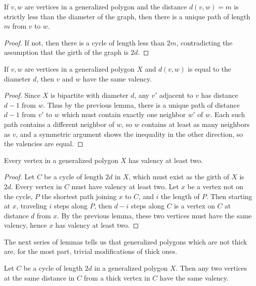 \begin{lemma}
	If $v,w$ are vertices in a generalized polygon and the distance $d(v,w)=m$ is strictly less than the diameter of the graph, then there is a unique path of length $m$ from $v$ to $w$.
\end{lemma}
\begin{proof}
	If not, then there is a cycle of length less than $2m$, contradicting the assumption that the girth of the graph is $2d$.
\end{proof}
\begin{lemma}
	If $v,w$ are vertices in a generalized polygon $X$ and $d(v,w)$ is equal to the diameter $d$, then $v$ and $w$ have the same valency.
\end{lemma}
\begin{proof}
	Since $X$ is bipartite with diameter $d$, any $v'$ adjacent to $v$ has distance $d-1$ from $w$.  Thus by the previous lemma, there is a unique path of distance $d-1$ from $v'$ to $w$ which must contain exactly one neighbor $w'$ of $w$.  Each such path contains a different neighbor of $w$, so $w$ contains at least as many neighbors as $v$, and a symmetric argument shows the inequality in the other direction, so the valencies are equal.
\end{proof}
\begin{lemma}
	Every vertex in a generalized polygon $X$ has valency at least two.
\end{lemma}
\begin{proof}
	Let $C$ be a cycle of length $2d$ in $X$, which must exist as the girth of $X$ is $2d$.  Every vertex in $C$ must have valency at least two.  Let $x$ be a vertex not on the cycle, $P$ the shortest path joining $x$ to $C$, and $i$ the length of $P$.  Then starting at $x$, traveling $i$ steps along $P$, then $d-i$ steps along $C$ is a vertex on $C$ at distance $d$ from $x$.  By the previous lemma, these two vertices must have the same valency, hence $x$ has valency at least two.
\end{proof}

The next series of lemmas tells us that generalized polygons which are not thick are, for the most part, trivial modifications of thick ones.
\begin{lemma}
	Let $C$ be  a cycle of length  $2d$ in a generalized polygon $X$.  Then any two vertices at the same distance in $C$ from a thick vertex in $C$ have the same valency.
\end{lemma}

